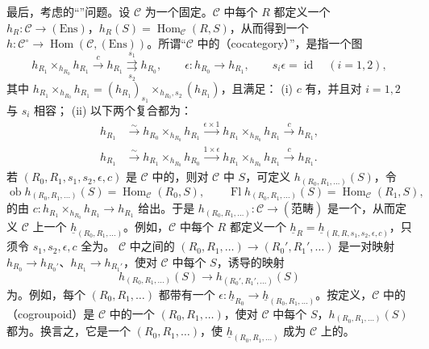 最后，考虑的“”问题。设 $\mathcal C$ 为一个固定。$\mathcal C$ 中每个 $R$ 都定义一个 $h_R:\mathcal C\to(\mathrm{Ens})$，$h_R(S)=\operatorname{Hom}_{\mathcal C}(R,S)$，从而得到一个 $h:\mathcal C^\circ\to\operatorname{Hom}(\mathcal C,(\mathrm{Ens}))$。所谓“$\mathcal C$ 中的（cocategory）”，是指一个图
\[
 h_{R_1}\times_{h_{R_0}}h_{R_1}\xrightarrow c h_{R_1}
 \underset{s_2}{\overset{s_1}{\rightrightarrows}}h_{R_0},
 \qquad \epsilon:h_{R_0}\longrightarrow h_{R_1},
 \qquad s_i\epsilon=\operatorname{id}\quad(i=1,2),
\]
其中 $h_{R_1}\times_{h_{R_0}}h_{R_1}=(h_{R_1})_{s_1}\times_{h_{R_0},s_2}(h_{R_1})$，且满足：
(i) $c$ 有，并且对 $i=1,2$ 与 $s_i$ 相容；
(ii) 以下两个复合都为：
\[
\begin{aligned}
h_{R_1}&\xrightarrow\sim h_{R_0}\times_{h_{R_0}}h_{R_1}
 \xrightarrow{\epsilon\times1}h_{R_1}\times_{h_{R_0}}h_{R_1}\xrightarrow c h_{R_1},\\
h_{R_1}&\xrightarrow\sim h_{R_1}\times_{h_{R_0}}h_{R_0}
 \xrightarrow{1\times\epsilon}h_{R_1}\times_{h_{R_0}}h_{R_1}\xrightarrow c h_{R_1}.
\end{aligned}
\]
若 $(R_0,R_1,s_1,s_2,\epsilon,c)$ 是 $\mathcal C$ 中的，则对 $\mathcal C$ 中 $S$，可定义 $h_{(R_0,R_1,\ldots)}(S)$，令
\[
\operatorname{ob}h_{(R_0,R_1,\ldots)}(S)=\operatorname{Hom}_{\mathcal C}(R_0,S),\qquad
\operatorname{Fl}h_{(R_0,R_1,\ldots)}(S)=\operatorname{Hom}_{\mathcal C}(R_1,S),
\]
的由 $c:h_{R_1}\times_{h_{R_0}}h_{R_1}\to h_{R_1}$ 给出。于是
$h_{(R_0,R_1,\ldots)}:\mathcal C\to(\text{范畴})$ 是一个，从而定义 $\mathcal C$ 上一个 $\underline h_{(R_0,R_1,\ldots)}$。例如，$\mathcal C$ 中每个 $R$ 都定义一个 $\underline h_R=\underline h_{(R,R,s_1,s_2,\epsilon,c)}$，只须令 $s_1,s_2,\epsilon,c$ 全为。
$\mathcal C$ 中之间的 $(R_0,R_1,\ldots)\to(R_0',R_1',\ldots)$
是一对映射 $h_{R_0}\to h_{R_0'}$、$h_{R_1}\to h_{R_1'}$，使对 $\mathcal C$ 中每个 $S$，诱导的映射
\[h_{(R_0,R_1,\ldots)}(S)\longrightarrow h_{(R_0',R_1',\ldots)}(S)\]
为。例如，每个 $(R_0,R_1,\ldots)$ 都带有一个 $\epsilon:\underline h_{R_0}\to\underline h_{(R_0,R_1,\ldots)}$。按定义，$\mathcal C$ 中的（cogroupoid）是 $\mathcal C$ 中的一个 $(R_0,R_1,\ldots)$，使对 $\mathcal C$ 中每个 $S$，$h_{(R_0,R_1,\ldots)}(S)$ 都为。换言之，它是一个 $(R_0,R_1,\ldots)$，使 $\underline h_{(R_0,R_1,\ldots)}$ 成为 $\mathcal C$ 上的。

